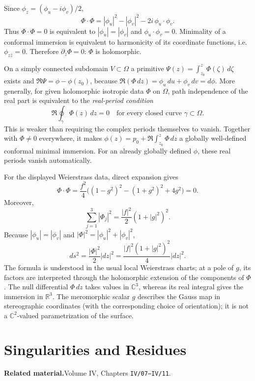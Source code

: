 \begin{solution}
Since $\phi_z=(\phi_u-i\phi_v)/2$,
\[
\Phi\cdot\Phi=|\phi_u|^2-|\phi_v|^2
                     -2i\,\phi_u\cdot\phi_v.
\]
Thus $\Phi\cdot\Phi=0$ is equivalent to
$|\phi_u|=|\phi_v|$ and $\phi_u\cdot\phi_v=0$.
Minimality of a conformal immersion is equivalent to harmonicity of its
coordinate functions, i.e. $\phi_{z\bar z}=0$. Therefore
$\partial_{\bar z}\Phi=0$: $\Phi$ is holomorphic.

On a simply connected subdomain $V\subset\Omega$ a primitive
$\Psi(z)=\int_{z_0}^z\Phi(\zeta)\,d\zeta$ exists and
$\Re\Psi=\phi-\phi(z_0)$, because
$\Re(\Phi\,dz)=\phi_u\,du+\phi_v\,dv=d\phi$.
More generally, for given holomorphic isotropic data $\Phi$ on $\Omega$,
path independence of the real part is equivalent to the \emph{real-period
condition}
\[
\boxed{\ \Re\oint_\gamma\Phi(z)\,dz=0
       \quad\text{for every closed curve }\gamma\subset\Omega.\ }
\]
This is weaker than requiring the complex periods themselves to vanish.
Together with $\Phi\ne0$ everywhere, it makes
$\phi(z)=p_0+\Re\int_{z_0}^z\Phi\,dz$ a globally well-defined
conformal minimal immersion. For an already globally defined $\phi$,
these real periods vanish automatically.

For the displayed Weierstrass data, direct expansion gives
\[
\Phi\cdot\Phi
=\frac{f^2}{4}\bigl((1-g^2)^2-(1+g^2)^2+4g^2\bigr)=0.
\]
Moreover,
\[
\sum_{j=1}^3|\Phi_j|^2
=\frac{|f|^2}{2}(1+|g|^2)^2.
\]
Because $|\phi_u|=|\phi_v|$ and
$|\Phi|^2=|\phi_u|^2+|\phi_v|^2$,
\[
ds^2=\frac{|\Phi|^2}{2}|dz|^2
=\frac{|f|^2(1+|g|^2)^2}{4}|dz|^2.
\]
The formula is understood in the usual local Weierstrass charts; at a
pole of $g$, its factors are interpreted through the holomorphic
extension of the components of $\Phi$.
The null differential $\Phi\,dz$ takes values in $\mathbb C^3$,
whereas its real integral gives the immersion in $\mathbb R^3$.
The meromorphic scalar $g$ describes the Gauss map in stereographic
coordinates (with the corresponding choice of orientation); it is not
a $\mathbb C^2$-valued parametrization of the surface.
\end{solution}


\section{Singularities and Residues}

\par\medskip\noindent\textbf{Related material.}\quad Volume IV, Chapters \texttt{IV/07--IV/11}.

